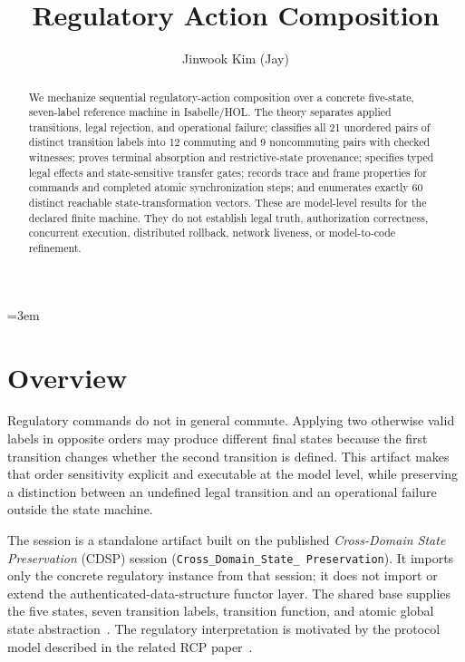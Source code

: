 \documentclass[11pt,a4paper]{article}
\begin{document}
\emergencystretch=3em

\title{Regulatory Action Composition}
\author{Jinwook Kim (Jay)}
\maketitle

\begin{abstract}
We mechanize sequential regulatory-action composition over a concrete
five-state, seven-label reference machine in Isabelle/HOL.  The theory
separates applied transitions, legal rejection, and operational failure;
classifies all 21 unordered pairs of distinct transition labels into 12
commuting and 9 noncommuting pairs with checked witnesses; proves terminal
absorption and restrictive-state provenance; specifies typed legal effects
and state-sensitive transfer gates; records trace and frame properties for
commands and completed atomic synchronization steps; and enumerates exactly
60 distinct reachable state-transformation vectors.  These are model-level
results for the declared finite machine.  They do not establish legal truth,
authorization correctness, concurrent execution, distributed rollback,
network liveness, or model-to-code refinement.
\end{abstract}

\clearpage
\tableofcontents
\clearpage

\section{Overview}

Regulatory commands do not in general commute.  Applying two otherwise valid
labels in opposite orders may produce different final states because the
first transition changes whether the second transition is defined.  This
artifact makes that order sensitivity explicit and executable at the model
level, while preserving a distinction between an undefined legal transition
and an operational failure outside the state machine.

The session is a standalone artifact built on the published
\emph{Cross-Domain State Preservation} (CDSP) session
(\texttt{Cross\_\allowbreak Domain\_\allowbreak State\_\allowbreak
Preservation}).  It imports only the concrete regulatory instance from that
session; it does not import or extend the authenticated-data-structure
functor layer.  The shared base supplies the five states, seven transition
labels, transition function, and atomic global state
abstraction~\cite{cdsp}.  The regulatory interpretation is motivated by the
protocol model described in the related RCP paper~\cite{rcp}.
\end{document}
